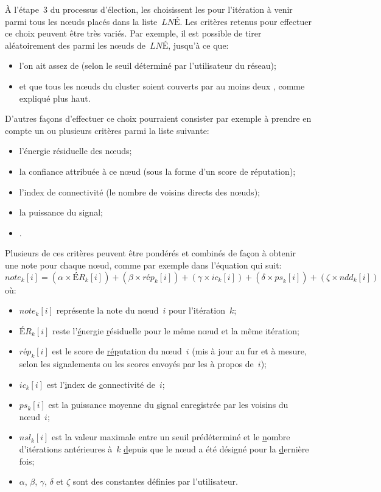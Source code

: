 À l'étape~3 du processus d'élection, les \chs choisissent les \cns pour l'itération à venir parmi tous les nœuds placés dans la liste~$\mathit{LNÉ}$.
Les critères retenus pour effectuer ce choix peuvent être très variés.
Par exemple, il est possible de tirer aléatoirement des \cns parmi les nœuds de~$\mathit{LNÉ}$, jusqu'à ce que:
\begin{itemize}
    \item l'on ait assez de \cns (selon le seuil déterminé par l'utilisateur du réseau);
    \item et que tous les nœuds du cluster soient couverts par au moins deux \cns, comme expliqué plus haut.
\end{itemize}
D'autres façons d'effectuer ce choix pourraient consister par exemple à prendre en compte un ou plusieurs critères parmi la liste suivante:
\begin{itemize}
    \item l'énergie résiduelle des nœuds;
    \item la confiance attribuée à ce nœud (sous la forme d'un score de réputation);
    \item l'index de connectivité (le nombre de voisins directs des nœuds);
    \item la puissance du signal;
    \item \etc.
\end{itemize}
Plusieurs de ces critères peuvent être pondérés et combinés de façon à obtenir une note pour chaque nœud, comme par exemple dans l'équation qui suit:%
\begin{equation*}
    \label{se:eqn:score}
    \mathit{note}_k[i] = (\alpha \times \mathit{ÉR}_k[i]) + (\beta \times \mathit{rép}_k[i]) + (\gamma \times \mathit{ic}_k[i]) + (\delta \times \mathit{ps}_k[i]) + (\zeta \times \mathit{ndd}_k[i])
\end{equation*}
où:
\begin{itemize}
    \item $\mathit{note}_k[i]$ représente la note du nœud~$i$ pour l'itération~$k$;
    \item $\mathit{ÉR}_k[i]$ reste l'\underline{é}nergie \underline{r}ésiduelle pour le même nœud et la même itération;
    \item $\mathit{rép}_k[i]$ est le score de \underline{rép}utation du nœud~$i$ (mis à jour au fur et à mesure, selon les signalements ou les scores envoyés par les \cns à propos de~$i$);
    \item $\mathit{ic}_k[i]$ est l'\underline{i}ndex de \underline{c}onnectivité de~$i$;
    \item $ps_k[i]$ est la \underline{p}uissance moyenne du \underline{s}ignal enregistrée par les voisins du nœud~$i$;
    \item $nsl_k[i]$ est la valeur maximale entre un seuil prédéterminé et le \underline{n}ombre d'itérations antérieures à~$k$ \underline{d}epuis que le nœud a été désigné \cn pour la \underline{d}ernière fois;
    \item $\alpha$, $\beta$, $\gamma$, $\delta$ et $\zeta$ sont des constantes définies par l'utilisateur.
\end{itemize}
